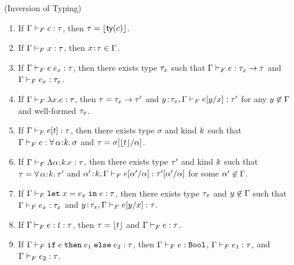 \begin{fullversion}
\begin{lemma}\label{lem:inversionF} (Inversion of Typing) 
    \begin{enumerate}%
        \item If $\hasftype{\tcenv}{c}{\sftype}$, 
            then $\sftype = \forgetreft{\ty{c}}$.
        \item If $\hasftype{\tcenv}{x}{\sftype}$, 
            then $\bind{x}{\sftype} \in \tcenv$.
        \item If $\hasftype{\tcenv}{\app{e}{e_x}}{\sftype}$,
            then there exists type $\sftype_x$ such that  
            $\hasftype{\tcenv}{e}{\funcftype{\sftype_x}{\sftype}}$ and
            $\hasftype{\tcenv}{e_x}{\sftype_x}$.
        \item If $\hasftype{\tcenv}{\vabs{x}{e}}{\sftype}$,\! 
            then $\sftype = \funcftype{\sftype_x}{\sftype'}$ and
            $\hasftype{\bind{y}{\sftype_x},\tcenv}{\subst{e}{x}{y}}{\sftype'}$
            for any $\notmem{y}{\tcenv}$ and well-formed $\sftype_x$.
        \item If $\hasftype{\tcenv}{\tyapp{e}{t}}{\sftype}$,\! then there exists 
            type $\sigma$ and kind $\skind$ such that 
            $\hasftype{\tcenv}{e}{\polytype{\al}{\skind}{\sigma}}$
            and $\sftype = \subst{\sigma}{\al}{\forgetreft{t}}$.
        \item If $\hasftype{\tcenv}{\tabs{\al}{\skind}{e}}{\sftype}$, then
            there exists type $\sftype'$ and kind $\skind$ such that
            $\sftype = {\polytype{\al}{\skind}{\sftype'}}$ and
            $\hasftype{\bind{\al'}{\skind},\tcenv}{\subst{e}{\al}{\al'}}
            {\subst{\sftype'}{\al}{\al'}}$ for some $\notmem{\al'}{\tcenv}$.
        \item If $\hasftype{\tcenv}{\eletin{x}{e_x}{e}}{\sftype}$, then
            there exists type $\sftype_x$ and $\notmem{y}{\tcenv}$ such that
            $\hasftype{\tcenv}{e_x}{\sftype_x}$ and 
            $\hasftype{\bind{y}{\sftype_x},\tcenv}{\subst{e}{x}{y}}{\sftype}$.
        \item If $\hasftype{\tcenv}{\tyann{e}{t}}{\sftype}$, then 
            $\sftype = \forgetreft{t}$ and $\hasftype{\tcenv}{e}{\sftype}$.
        
        \item If $\hasftype{\tcenv}{\eif{e}{e_1}{e_2}}{\sftype}$, then
            $\hasftype{\tcenv}{e}{\tbool}$,
            $\hasftype{\tcenv}{e_1}{\sftype}$, and 
            $\hasftype{\tcenv}{e_2}{\sftype}$.
    \end{enumerate}
\end{lemma}


\end{fullversion}
